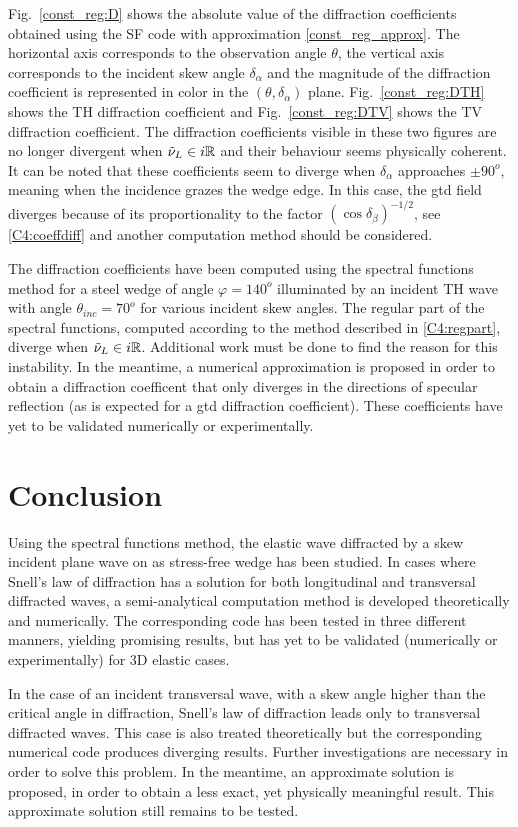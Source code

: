 Fig.~\ref{const_reg:D} shows the absolute value of the diffraction coefficients obtained using the SF code with approximation \eqref{const_reg_approx}. The horizontal axis corresponds to the observation angle $\theta$, the vertical axis corresponds to the incident skew angle $\delta_{\alpha}$ and the magnitude of the diffraction coefficient is represented in color in the $(\theta,\delta_{\alpha})$ plane. Fig.~\ref{const_reg:DTH} shows the TH diffraction coefficient and Fig.~\ref{const_reg:DTV} shows the TV diffraction coefficient. The diffraction coefficients visible in these two figures are no longer divergent when $\tilde{\nu}_L \in i\mathbb{R}$ and their behaviour seems physically coherent. It can be noted that these coefficients seem to diverge when $\delta_{\alpha}$ approaches $\pm90^o$, meaning when the incidence grazes the wedge edge. In this case, the \acrshort{gtd} field diverges because of its proportionality to the factor $(\cos\delta_{\beta})^{-1/2}$, see \eqref{C4:coeffdiff} and another computation method should be considered.

The diffraction coefficients have been computed using the spectral functions method for a steel wedge of angle $\varphi=140^o$ illuminated by an incident TH wave with angle $\theta_{inc}=70^o$ for various incident skew angles. The regular part of the spectral functions, computed according to the method described in \ref{C4:regpart}, diverge when $\tilde{\nu}_L \in i\mathbb{R}$. Additional work must be done to find the reason for this instability. In the meantime, a numerical approximation is proposed in order to obtain a diffraction coefficent that only diverges in the directions of specular reflection (as is expected for a \acrshort{gtd} diffraction coefficient). These coefficients have yet to be validated numerically or experimentally.

\section*{Conclusion}
Using the spectral functions method, the elastic wave diffracted by a skew incident plane wave on as stress-free wedge has been studied. In cases where Snell's law of diffraction has a solution for both longitudinal and transversal diffracted waves, a semi-analytical computation method is developed theoretically and numerically. The corresponding code has been tested in three different manners, yielding promising results, but has yet to be validated (numerically or experimentally) for 3D elastic cases. 

In the case of an incident transversal wave, with a skew angle higher than the critical angle in diffraction, Snell's law of diffraction leads only to transversal diffracted waves. This case is also treated theoretically but the corresponding numerical code produces diverging results. Further investigations are necessary in order to solve this problem. In the meantime, an approximate solution is proposed, in order to obtain a less exact, yet physically meaningful result. This approximate solution still remains to be tested.
